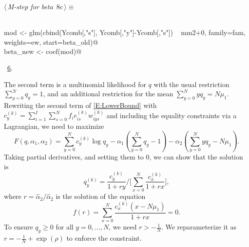 \documentclass[reqno]{amsart}
\renewcommand{\NWtarget}[2]{\hypertarget{#1}{#2}}
\renewcommand{\NWlink}[2]{\hyperlink{#1}{#2}}
\begin{document}
\begin{flushleft} \small\label{scrap11}\raggedright\small
\NWtarget{nuweb8c}{} $\langle\,${\itshape M-step for beta}\nobreak\ {\footnotesize {8c}}$\,\rangle\equiv$
\vspace{-1ex}
\begin{list}{}{} \item
\mbox{}\verb@@\\
\mbox{}\verb@    mod <- glm(cbind(Ycomb[,"s"], Ycomb[,"y"]-Ycomb[,"s"]) ~ mm2+0, family=fam, weights=ew, start=beta_old)@\\
\mbox{}\verb@    beta_new <- coef(mod)@\\
\mbox{}\verb@@{\NWsep}
\end{list}
\vspace{-1.5ex}
\footnotesize
\begin{list}{}{\setlength{\itemsep}{-\parsep}\setlength{\itemindent}{-\leftmargin}}
\item \NWtxtMacroRefIn\ \NWlink{nuweb6}{6}.

\item{}
\end{list}
\vspace{4ex}
\end{flushleft}
The second term is a multinomial likelihood for $q$ with the usual restriction  $\sum_{y=0}^N q_y=1$, and an additional restriction for the mean $\sum_{y=0}^{N}yq_y=N \mu_1$. Rewriting the second term of \eqref{E:LowerBound} with $c^{(k)}_y = \sum_{i=1}^I \sum_{s=0}^N f_i e_{is}^{(k)} w_{iys}^{(k)}$ and including the equality constraints via a Lagrangian, we need to maximize
\begin{equation*}
  F(q,\alpha_1,\alpha_2) = \sum_{y=0}^{N}c^{(k)}_y\log q_y - \alpha_1 (\sum_{y=0}^{N}q_y - 1) - \alpha_2 (\sum_{y=0}^{N}yq_y - N\mu_1).
\end{equation*}
Taking partial derivatives, and setting them to 0, we can show that the solution is
\begin{equation}\label{E:q_update}
  q^{(k)}_y = \frac{c^{(k)}_y}{1+r y} \Big/ \Big[ \sum_{x=0}^{N}\frac{c^{(k)}_x}{1+r x}\Big],
\end{equation}
where $r=\hat\alpha_2 / \hat\alpha_2$ is the solution of the equation
\begin{equation}\label{E:r_equation}
   f(r) = \sum_{x=0}^{N}\frac{c^{(k)}_x (x - N\mu_1)}{1+r x} = 0.
\end{equation}
To ensure $q_y\geq 0$ for all $y=0,\ldots,N$, we need $r> -\frac 1N$. We reparameterize it as $r=-\frac 1N+\exp(\rho)$ to enforce the constraint.
\end{document}
